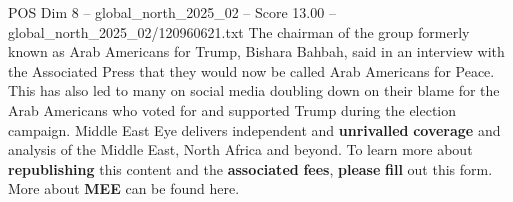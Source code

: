 \begin{textsample}{POS Dim 8 – global\_north\_2025\_02 – Score 13.00 – global\_north\_2025\_02/120960621.txt}
The chairman of the group formerly known as Arab Americans for Trump, Bishara Bahbah, said in an interview with the Associated Press that they would now be called Arab Americans for Peace.
This has also led to many on social media doubling down on their blame for the Arab Americans who voted for and supported Trump during the election campaign.
Middle East Eye delivers independent and \textbf{unrivalled} \textbf{coverage} and analysis of the Middle East, North Africa and beyond.
To learn more about \textbf{republishing} this content and the \textbf{associated} \textbf{fees}, \textbf{please} \textbf{fill} out this form.
More about \textbf{MEE} can be found here.

\end{textsample}
